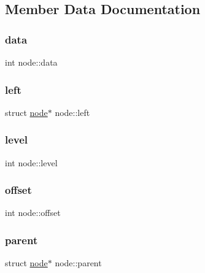 \subsection{Member Data Documentation}
\mbox{\label{structnode_a2d890bb9f6af0ffd73fe79b21124c2a2}} 
\subsubsection{\texorpdfstring{data}{data}}
{\footnotesize\ttfamily int node\+::data}

\mbox{\label{structnode_a3ce38490a651bfda86d88ff955e96abc}} 
\subsubsection{\texorpdfstring{left}{left}}
{\footnotesize\ttfamily struct \hyperlink{structnode}{node}$\ast$ node\+::left}

\mbox{\label{structnode_a3871d43e823ba9542b052912d01709dd}} 
\subsubsection{\texorpdfstring{level}{level}}
{\footnotesize\ttfamily int node\+::level}

\mbox{\label{structnode_aeef7855fea382bfb671d7834aefa4b22}} 
\subsubsection{\texorpdfstring{offset}{offset}}
{\footnotesize\ttfamily int node\+::offset}

\mbox{\label{structnode_a05e4fe9e0177ba2d8dbd2c487cfddd53}} 
\subsubsection{\texorpdfstring{parent}{parent}}
{\footnotesize\ttfamily struct \hyperlink{structnode}{node}$\ast$ node\+::parent}

